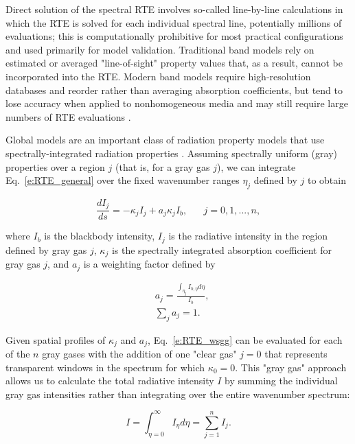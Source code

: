 \documentclass[preprint,12pt]{elsarticle}
\newcounter{bla}
\begin{document}
Direct solution of the spectral RTE involves so-called line-by-line calculations in which the RTE is solved for each individual spectral line, potentially millions of evaluations; this is computationally prohibitive for most practical configurations and used primarily for model validation. Traditional band models rely on estimated or averaged "line-of-sight" property values that, as a result, cannot be incorporated into the RTE. Modern band models require high-resolution databases and reorder rather than averaging absorption coefficients, but tend to lose accuracy when applied to nonhomogeneous media and may still require large numbers of RTE evaluations \citep{Modest_2016}. 

Global models are an important class of radiation property models that use spectrally-integrated radiation properties \cite{Hottel_1967,Modest_2013,Modest_2016}. Assuming spectrally uniform (gray) properties over a region $j$ (that is, for a gray gas $j$), we can integrate Eq.~\ref{e:RTE_general} over the fixed wavenumber ranges $\eta_j$ defined by $j$ to obtain 
%
\begin{linenomath}
\begin{equation} \label{e:RTE_wsgg}
	\frac{dI_j}{ds} = -\kappa_jI_j + a_j\kappa_jI_b, \hspace{20pt} j=0,1,...,n,
\end{equation}
\end{linenomath}
%
where $I_b$ is the blackbody intensity, $I_j$ is the radiative intensity in the region defined by gray gas $j$, $\kappa_j$ is the spectrally integrated absorption coefficient for gray gas $j$, and $a_j$ is a weighting factor defined by
%
\begin{linenomath}
\begin{align}
    &a_j= \frac{\int_{\eta_j}I_{b,\eta}d\eta}{I_b},\\
    &\sum_j a_j = 1.
\end{align}
\end{linenomath}
%
Given spatial profiles of $\kappa_j$ and $a_j$, Eq.~\ref{e:RTE_wsgg} can be evaluated for each of the $n$ gray gases with the addition of one "clear gas" $j=0$ that represents transparent windows in the spectrum for which $\kappa_0=0$. This "gray gas" approach allows us to calculate the total radiative intensity $I$ by summing the individual gray gas intensities rather than integrating over the entire wavenumber spectrum: 
%
\begin{linenomath}
\begin{equation}
	I=\int_{\eta=0}^{\infty}I_{\eta}d\eta=\sum_{j=1}^n I_j.
\end{equation}
\end{linenomath}
\end{document}
